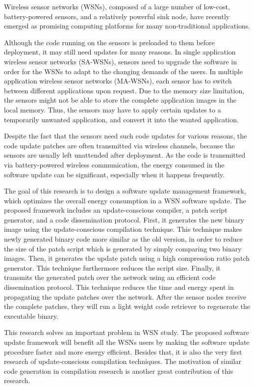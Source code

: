Wireless sensor networks (WSNs), composed of a large number of low-cost, battery-powered sensors, and a relatively powerful sink node, have recently emerged as promising computing platforms for many non-traditional applications. 

Although the code running on the sensors is preloaded to them before deployment, it may still need updates for many reasons. 
In single application wireless sensor networks (SA-WSNs), sensors need to upgrade the software in order for the WSNs to adapt to the changing demands of the users.
In multiple application wireless sensor networks (MA-WSNs), each sensor has to switch between different applications upon request. Due to the memory size limitation, the sensors might not be able to store the complete application images in the local memory. Thus, the sensors may have to apply certain updates to a temporarily unwanted application, and convert it into the wanted application.

Despite the fact that the sensors need such code updates for various reasons, the code update patches are often transmitted via wireless channels, because the sensors are usually left unattended after deployment. As the code is transmitted via battery-powered wireless communication, the energy consumed in the software update can be significant, especially when it happens frequently.

The goal of this research is to design a software update management framework, which optimizes the overall energy consumption in a WSN software update. The proposed framework includes an update-conscious compiler, a patch script generator, and a code dissemination protocol.
First, it generates the new binary image using the update-conscious compilation technique. This technique makes newly generated binary code more similar as the old version, in order to reduce the size of the patch script which is generated by simply comparing two binary images. Then, it generates the update patch using a high compression ratio patch generator. This technique furthermore reduces the script size. 
Finally, it transmits the generated patch over the network using an efficient code dissemination protocol. This technique reduces the time and energy spent in propagating the update patches over the network. After the sensor nodes receive the complete patches, they will run a light weight code retriever to regenerate the executable binary.


This research solves an important problem in WSN study. The proposed software update framework will benefit all the WSNs users by making the software update procedure faster and more energy efficient. Besides that, it is also the very first research of update-conscious compilation techniques. The motivation of similar code generation in compilation research is another great contribution of this research. 